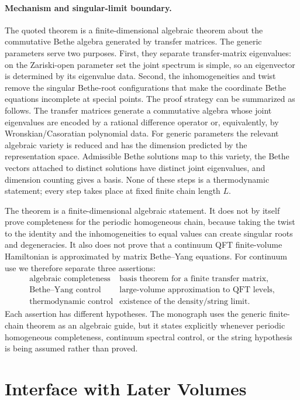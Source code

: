 \paragraph{Mechanism and singular-limit boundary.}
The quoted theorem is a finite-dimensional algebraic theorem about the
commutative Bethe algebra generated by transfer matrices.  The generic
parameters serve two purposes.  First, they separate transfer-matrix
eigenvalues: on the Zariski-open parameter set the joint spectrum is simple,
so an eigenvector is determined by its eigenvalue data.  Second, the
inhomogeneities and twist remove the singular Bethe-root configurations that
make the coordinate Bethe equations incomplete at special points.  The proof
strategy can be summarized as follows.  The transfer matrices generate a
commutative algebra whose joint eigenvalues are encoded by a rational
difference operator or, equivalently, by Wronskian/Casoratian polynomial data.
For generic parameters the relevant algebraic variety is reduced and has the
dimension predicted by the representation space.  Admissible Bethe solutions
map to this variety, the Bethe vectors attached to distinct solutions have
distinct joint eigenvalues, and dimension counting gives a basis.  None of
these steps is a thermodynamic statement; every step takes place at fixed
finite chain length \(L\).

The theorem is a finite-dimensional algebraic statement.  It does not by
itself prove completeness for the periodic homogeneous chain, because taking
the twist to the identity and the inhomogeneities to equal values can create
singular roots and degeneracies.  It also does not prove that a continuum QFT
finite-volume Hamiltonian is approximated by matrix Bethe--Yang equations.
For continuum use we therefore separate three assertions:
\[
\begin{array}{ll}
\text{algebraic completeness} & \text{basis theorem for a finite transfer matrix,}\\
\text{Bethe--Yang control} & \text{large-volume approximation to QFT levels,}\\
\text{thermodynamic control} & \text{existence of the density/string limit.}
\end{array}
\]
Each assertion has different hypotheses.  The monograph uses the generic
finite-chain theorem as an algebraic guide, but it states explicitly whenever
periodic homogeneous completeness, continuum spectral control, or the string
hypothesis is being assumed rather than proved.

\section{Interface with Later Volumes}

